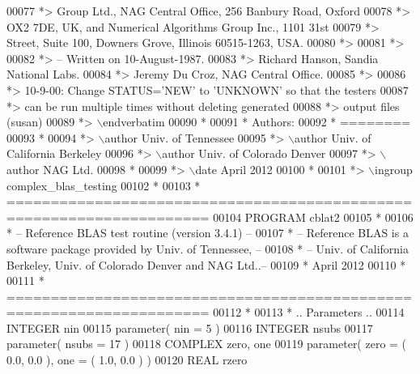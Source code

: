 \begin{DoxyCode}
00077 \textcolor{comment}{*>       Group  Ltd.,  NAG  Central  Office,  256  Banbury  Road, Oxford}
00078 \textcolor{comment}{*>       OX2 7DE, UK,  and  Numerical Algorithms Group Inc.,  1101  31st}
00079 \textcolor{comment}{*>       Street,  Suite 100,  Downers Grove,  Illinois 60515-1263,  USA.}
00080 \textcolor{comment}{*>}
00081 \textcolor{comment}{*>}
00082 \textcolor{comment}{*> -- Written on 10-August-1987.}
00083 \textcolor{comment}{*>    Richard Hanson, Sandia National Labs.}
00084 \textcolor{comment}{*>    Jeremy Du Croz, NAG Central Office.}
00085 \textcolor{comment}{*>}
00086 \textcolor{comment}{*>    10-9-00:  Change STATUS='NEW' to 'UNKNOWN' so that the testers}
00087 \textcolor{comment}{*>              can be run multiple times without deleting generated}
00088 \textcolor{comment}{*>              output files (susan)}
00089 \textcolor{comment}{*> \(\backslash\)endverbatim}
00090 \textcolor{comment}{*}
00091 \textcolor{comment}{*  Authors:}
00092 \textcolor{comment}{*  ========}
00093 \textcolor{comment}{*}
00094 \textcolor{comment}{*> \(\backslash\)author Univ. of Tennessee }
00095 \textcolor{comment}{*> \(\backslash\)author Univ. of California Berkeley }
00096 \textcolor{comment}{*> \(\backslash\)author Univ. of Colorado Denver }
00097 \textcolor{comment}{*> \(\backslash\)author NAG Ltd. }
00098 \textcolor{comment}{*}
00099 \textcolor{comment}{*> \(\backslash\)date April 2012}
00100 \textcolor{comment}{*}
00101 \textcolor{comment}{*> \(\backslash\)ingroup complex\_blas\_testing}
00102 \textcolor{comment}{*}
00103 \textcolor{comment}{*  =====================================================================}
00104       \textcolor{keyword}{PROGRAM} cblat2
00105 \textcolor{comment}{*}
00106 \textcolor{comment}{*  -- Reference BLAS test routine (version 3.4.1) --}
00107 \textcolor{comment}{*  -- Reference BLAS is a software package provided by Univ. of Tennessee,    --}
00108 \textcolor{comment}{*  -- Univ. of California Berkeley, Univ. of Colorado Denver and NAG Ltd..--}
00109 \textcolor{comment}{*     April 2012}
00110 \textcolor{comment}{*}
00111 \textcolor{comment}{*  =====================================================================}
00112 \textcolor{comment}{*}
00113 \textcolor{comment}{*     .. Parameters ..}
00114       \textcolor{keywordtype}{INTEGER}            nin
00115       parameter( nin = 5 )
00116       \textcolor{keywordtype}{INTEGER}            nsubs
00117       parameter( nsubs = 17 )
00118       \textcolor{keywordtype}{COMPLEX}            zero, one
00119       parameter( zero = ( 0.0, 0.0 ), one = ( 1.0, 0.0 ) )
00120       \textcolor{keywordtype}{REAL}               rzero

\end{DoxyCode}
